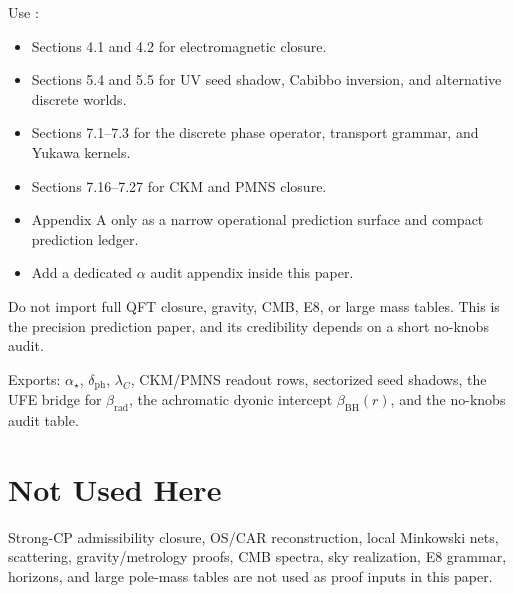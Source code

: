\documentclass[11pt,a4paper]{article}
\begin{document}
\begin{tfptsourcebox}
Use \sourceDraft:
\begin{itemize}[leftmargin=1.5em]
    \item Sections 4.1 and 4.2 for electromagnetic closure.
    \item Sections 5.4 and 5.5 for UV seed shadow, Cabibbo inversion, and alternative discrete
    worlds.
    \item Sections 7.1--7.3 for the discrete phase operator, transport grammar, and Yukawa kernels.
    \item Sections 7.16--7.27 for CKM and PMNS closure.
    \item Appendix A only as a narrow operational prediction surface and compact prediction ledger.
    \item Add a dedicated $\alpha$ audit appendix inside this paper.
\end{itemize}
\end{tfptsourcebox}

\begin{tfptwarningbox}
Do not import full QFT closure, gravity, CMB, E8, or large mass tables. This is the precision
prediction paper, and its credibility depends on a short no-knobs audit.
\end{tfptwarningbox}


\begin{tfptexports}
Exports: $\alpha_\star$, $\delta_{\mathrm{ph}}$, $\lambda_C$, CKM/PMNS readout rows, sectorized seed shadows, the UFE bridge for $\beta_{\mathrm{rad}}$, the achromatic dyonic intercept $\beta_{\mathrm{BH}}(r)$, and the no-knobs audit table.
\end{tfptexports}

\section{Not Used Here}

Strong-CP admissibility closure, OS/CAR reconstruction, local Minkowski nets, scattering,
gravity/metrology proofs, CMB spectra, sky realization, E8 grammar, horizons, and large pole-mass
tables are not used as proof inputs in this paper.

\clearpage

\end{document}
